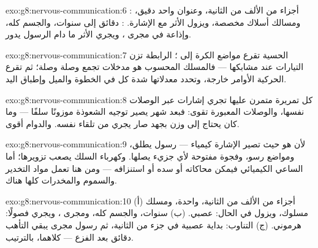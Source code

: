 \begin{solution}{exo:g8:nervous-communication:6}
: أجزاء من الألف من الثانية، وعنوان واحد دقيق،
ومسالك أسلاك مخصصة، ويزول الأثر مع الإشارة. :
دقائق إلى سنوات، والجسم كله، وإذاعة في مجرى ، ويجري
الأثر ما دام الرسول يدور.
\end{solution}

\begin{solution}{exo:g8:nervous-communication:7}
  الحسية تقرع مواضع الكرة إلى ؛
 الرابطة تزن التيارات عند مشابكها --- فالمسلك
المحسوب هو مدخلات تجمع وصلة وصلة؛ ثم تقرع 
الحركية الأوامر خارجة، وتحدد معدلاتها شدة كل  في
الخطوة والميل وإطباق اليد.
\end{solution}

\begin{solution}{exo:g8:nervous-communication:8}
كل تمريرة متمرن عليها تجري إشارات عبر الوصلات نفسها،
والوصلات المعبورة تقوى: فبعد شهر يصير توجيه الشعوذة
موزونًا سلفًا --- وما كان يحتاج إلى وزن بجهد صار يجري من
تلقاء نفسه. والدوام  أقوى.
\end{solution}

\begin{solution}{exo:g8:nervous-communication:9}
لأن  هو حيث تصير الإشارة كيمياء --- رسول يطلق،
ومواضع رسو، وفجوة مفتوحة لأي جزيء يصلها. وكهرباء السلك
يصعب تزويرها؛ أما الساعي الكيميائي فيمكن محاكاته أو سده
أو استنزافه --- ومن هنا تعمل مواد التخدير والسموم
والمخدرات كلها هناك.
\end{solution}

\begin{solution}{exo:g8:nervous-communication:10}
(أ) أجزاء من الألف من الثانية،   واحدة، ومسلك
مسلوك، ويزول في الحال: عصبي. (ب) سنوات، والجسم كله،
ومجرى ، ويجري فصولًا: هرموني. (ج) التناوب: بداية
عصبية في جزء من الثانية، ثم رسول مجرى  يبقي التأهب
دقائق بعد الفزع --- كلاهما، بالترتيب.
\end{solution}

